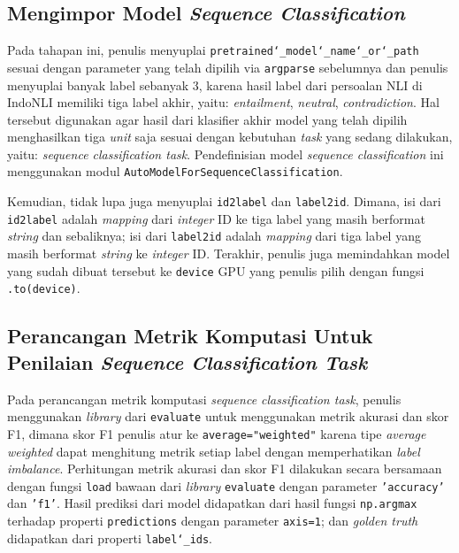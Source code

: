 \subsection{Mengimpor Model \emph{Sequence Classification}}
\label{4.1.5}
Pada tahapan ini, penulis menyuplai \texttt{pretrained\char`_model\char`_name\char`_or\char`_path} sesuai dengan parameter yang telah dipilih via \texttt{argparse} sebelumnya dan penulis menyuplai banyak label sebanyak 3, karena hasil label dari persoalan NLI di IndoNLI memiliki tiga label akhir, yaitu: \emph{entailment}, \emph{neutral}, \emph{contradiction}. Hal tersebut digunakan agar hasil dari klasifier akhir model yang telah dipilih menghasilkan tiga \emph{unit} saja sesuai dengan kebutuhan \emph{task} yang sedang dilakukan, yaitu: \emph{sequence classification task}. Pendefinisian model \emph{sequence classification} ini menggunakan modul \texttt{AutoModelForSequenceClassification}.

Kemudian, tidak lupa juga menyuplai \texttt{id2label} dan \texttt{label2id}. Dimana, isi dari \texttt{id2label} adalah \emph{mapping} dari \emph{integer} ID ke tiga label yang masih berformat \emph{string} dan sebaliknya; isi dari \texttt{label2id} adalah \emph{mapping} dari tiga label yang masih berformat \emph{string} ke \emph{integer} ID. Terakhir, penulis juga memindahkan model yang sudah dibuat tersebut ke \texttt{device} GPU yang penulis pilih dengan fungsi \texttt{.to(device)}.

\subsection{Perancangan Metrik Komputasi Untuk Penilaian \emph{Sequence Classification Task}}
\label{4.1.6}
Pada perancangan metrik komputasi \emph{sequence classification task}, penulis menggunakan \emph{library} dari \texttt{evaluate} untuk menggunakan metrik akurasi dan skor F1, dimana skor F1 penulis atur ke \texttt{average="weighted"} karena tipe \emph{average weighted} dapat menghitung metrik setiap label dengan memperhatikan \emph{label imbalance}. Perhitungan metrik akurasi dan skor F1 dilakukan secara bersamaan dengan fungsi \texttt{load} bawaan dari \emph{library} \texttt{evaluate} dengan parameter \texttt{'accuracy'} dan \texttt{'f1'}. Hasil prediksi dari model didapatkan dari hasil fungsi \texttt{np.argmax} terhadap properti \texttt{predictions} dengan parameter \texttt{axis=1}; dan \emph{golden truth} didapatkan dari properti \texttt{label\char`_ids}.

